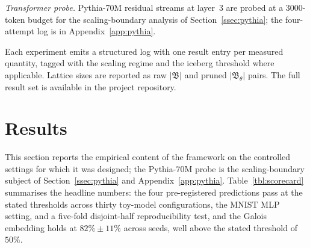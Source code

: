 \documentclass[a4paper,fleqn]{cas-dc}
\newcommand{\Lat}{\mathfrak{B}}
\begin{document}
\emph{Transformer probe.}
Pythia-70M residual streams at layer~3 are probed at a 3000-token budget for the scaling-boundary analysis of Section~\ref{ssec:pythia}; the four-attempt log is in Appendix~\ref{app:pythia}.

Each experiment emits a structured log with one result entry per measured quantity, tagged with the scaling regime and the iceberg threshold where applicable.
Lattice sizes are reported as raw $|\Lat|$ and pruned $|\Lat_\theta|$ pairs.
The full result set is available in the project repository.

\section{Results}\label{sec:results}

This section reports the empirical content of the framework on the controlled settings for which it was designed; the Pythia-70M probe is the scaling-boundary subject of Section~\ref{ssec:pythia} and Appendix~\ref{app:pythia}.
Table~\ref{tbl:scorecard} summarises the headline numbers: the four pre-registered predictions pass at the stated thresholds across thirty toy-model configurations, the MNIST MLP setting, and a five-fold disjoint-half reproducibility test, and the Galois embedding holds at $82\% \pm 11\%$ across seeds, well above the stated threshold of $50\%$.
\end{document}
